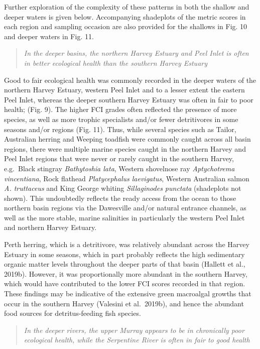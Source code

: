 \documentclass[
]{book}
\begin{document}
Further exploration of the complexity of these patterns in both the shallow and deeper waters is given below. Accompanying shadeplots of the metric scores in each region and sampling occasion are also provided for the shallows in Fig. 10 and deeper waters in Fig. 11.

\begin{quote}
\emph{In the deeper basins, the northern Harvey Estuary and Peel Inlet is often in better ecological health than the southern Harvey Estuary}
\end{quote}

Good to fair ecological health was commonly recorded in the deeper waters of the northern Harvey Estuary, western Peel Inlet and to a lesser extent the eastern Peel Inlet, whereas the deeper southern Harvey Estuary was often in fair to poor health; (Fig. 9). The higher FCI grades often reflected the presence of more species, as well as more trophic specialists and/or fewer detritivores in some seasons and/or regions (Fig. 11). Thus, while several species such as Tailor, Australian herring and Weeping toadfish were commonly caught across all basin regions, there were multiple marine species caught in the northern Harvey and Peel Inlet regions that were never or rarely caught in the southern Harvey, e.g.~Black stingray \emph{Bathytoshia lata}, Western shovelnose ray \emph{Aptychotrema vincentiana}, Rock flathead \emph{Platycephalus laevigatus}, Western Australian salmon \emph{A. truttaceus} and King George whiting \emph{Sillaginodes punctata} (shadeplots not shown). This undoubtedly reflects the ready access from the ocean to those northern basin regions via the Dawesville and/or natural entrance channels, as well as the more stable, marine salinities in particularly the western Peel Inlet and northern Harvey Estuary.

Perth herring, which is a detritivore, was relatively abundant across the Harvey Estuary in some seasons, which in part probably reflects the high sedimentary organic matter levels throughout the deeper parts of that basin (Hallett et al., 2019b). However, it was proportionally more abundant in the southern Harvey, which would have contributed to the lower FCI scores recorded in that region. These findings may be indicative of the extensive green macroalgal growths that occur in the southern Harvey (Valesini et al.~2019b), and hence the abundant food sources for detritus-feeding fish species.~

\begin{quote}
\emph{In the deeper rivers, the upper Murray appears to be in chronically poor ecological health, while the Serpentine River is often in fair to good health}
\end{quote}
\end{document}
